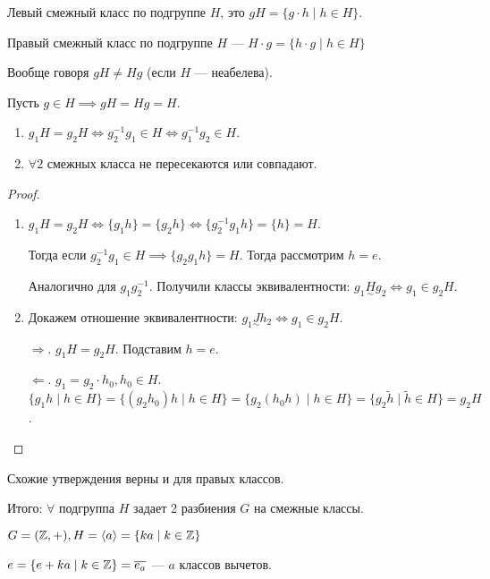 \begin{definition}
    Левый смежный класс по подгруппе $H$, это  $gH = \{g\cdot h \mid h \in H\}$.
\end{definition}
\begin{definition}
    Правый смежный класс по подгруппе $H$ ---  $H \cdot g = \{ h \cdot g \mid h \in H\}$
\end{definition}
Вообще говоря $gH \neq Hg$ (если $H$ --- неабелева).
\begin{example}
    Пусть $g \in H \implies gH = Hg=H$.
\end{example}
\begin{properties}
    \begin{enumerate}
        \item $g_1H = g_2H \iff g_2^{-1}g_1 \in H \iff g_1^{-1}g_2 \in H$.
        \item $\forall 2$ смежных класса не пересекаются или совпадают.
    \end{enumerate}
\end{properties}
\begin{proof}
    \begin{enumerate}
        \item $g_1H = g_2H \iff \{g_1h\} = \{g_2h\} \iff \{g_2^{-1}g_1h\} = \{h\} = H$.

            Тогда если $g_2^{-1}g_1 \in H \implies \{g_2 g_1h\} = H$. Тогда рассмотрим $h=e$.

            Аналогично для  $g_1g_2^{-1}$. Получили классы эквивалентности: $g_1 \underset{\sim}{H} g_2 \iff g_1\in g_2H$.
        \item Докажем отношение эквивалентности: $g_1 \underset{\sim}{J}h_2 \iff g_1 \in g_2H$.

            $\Rightarrow$.  $g_1H=g_2H$. Подставим $h=e$.

             $\Leftarrow$.  $g_1 = g_2 \cdot h_0, h_0 \in H$. $\{ g_1h \mid h \in H\} = \{(g_2h_0)h\mid h\in H\} = \{g_2(h_0h) \mid h\in H\} = \{g_2 \widetilde{h} \mid \widetilde{h} \in H\} = g_2H$.
    \end{enumerate}
\end{proof}
\begin{remark}
    Схожие утверждения верны и для правых классов.
\end{remark}
Итого: $\forall$ подгруппа  $H$ задает 2 разбиения  $G$ на смежные классы.
\begin{example}
    $G=(\mathbb{Z}, +), H = \langle a \rangle = \{ ka \mid k \in \mathbb{Z}\}$

    $e = \{e + ka \mid k \in \mathbb{Z}\} = \overline{e_a}$ ---  $a$ классов вычетов.
\end{example}
